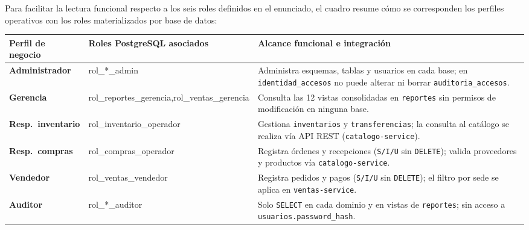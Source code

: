 \documentclass[11pt,oneside]{article}
\begin{document}
Para facilitar la lectura funcional respecto a los seis roles definidos en el
enunciado, el cuadro resume c\'omo se corresponden los perfiles operativos con
los roles materializados por base de datos:

\begin{center}
\renewcommand{\arraystretch}{1.35}
{\small
\begin{tabularx}{\linewidth}{%
    >{\sffamily\bfseries}p{2.9cm}
    >{\ttfamily\footnotesize}p{4.3cm}
    >{\raggedright\arraybackslash}X}
\toprule
\rowcolor{fondo}
{\sffamily\bfseries\footnotesize Perfil de negocio} &
{\sffamily\bfseries\footnotesize Roles PostgreSQL asociados} &
{\sffamily\bfseries\footnotesize Alcance funcional e integraci\'on} \\
\midrule
Administrador & rol\_*\_admin &
  Administra esquemas, tablas y usuarios en cada base; en \texttt{identidad\_accesos}
  no puede alterar ni borrar \texttt{auditoria\_accesos}. \\
Gerencia & rol\_reportes\_gerencia,\newline rol\_ventas\_gerencia &
  Consulta las 12 vistas consolidadas en \texttt{reportes} sin permisos de
  modificaci\'on en ninguna base. \\
Resp.\ inventario & rol\_inventario\_operador &
  Gestiona \texttt{inventarios} y \texttt{transferencias}; la consulta al
  cat\'alogo se realiza v\'ia API REST (\texttt{catalogo-service}). \\
Resp.\ compras & rol\_compras\_operador &
  Registra \'ordenes y recepciones (\texttt{S/I/U} sin \texttt{DELETE}); valida
  proveedores y productos v\'ia \texttt{catalogo-service}. \\
Vendedor & rol\_ventas\_vendedor &
  Registra pedidos y pagos (\texttt{S/I/U} sin \texttt{DELETE}); el filtro por
  sede se aplica en \texttt{ventas-service}. \\
Auditor & rol\_*\_auditor &
  Solo \texttt{SELECT} en cada dominio y en vistas de \texttt{reportes}; sin
  acceso a \texttt{usuarios.password\_hash}. \\
\bottomrule
\end{tabularx}}
\end{center}
\end{document}
